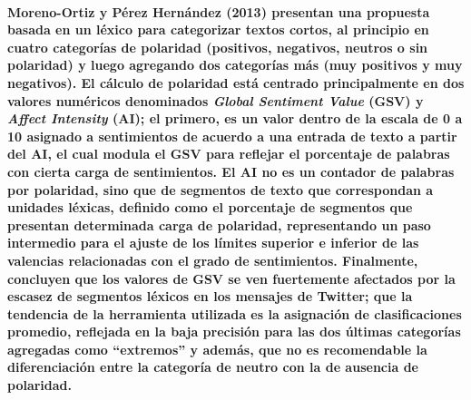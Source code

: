 \paragraph{Moreno-Ortiz y P\'erez Hern\'andez (2013) presentan una propuesta basada en un l\'exico para categorizar textos cortos, al principio en cuatro categor\'ias de polaridad (positivos, negativos, neutros o sin polaridad) y luego agregando dos categor\'ias m\'as (muy positivos y muy negativos). El c\'alculo de polaridad est\'a centrado principalmente en dos valores num\'ericos denominados \textit{Global Sentiment Value} (GSV) y \textit{Affect Intensity} (AI); el primero, es un valor dentro de la escala de 0 a 10 asignado a sentimientos de acuerdo a una entrada de texto a partir del AI, el cual modula el GSV para reflejar el porcentaje de palabras con cierta carga de sentimientos. El AI no es un contador de palabras por polaridad, sino que de segmentos de texto que correspondan a unidades l\'exicas, definido como el porcentaje de segmentos que presentan determinada carga de polaridad, representando un paso intermedio para el ajuste de los l\'imites superior e inferior de las valencias relacionadas con el grado de sentimientos. Finalmente, concluyen que los valores de GSV se ven fuertemente afectados por la escasez de segmentos l\'exicos en los mensajes de Twitter; que la tendencia de la herramienta utilizada es la asignaci\'on de clasificaciones promedio, reflejada en la baja precisi\'on para las dos \'ultimas categor\'ias agregadas como ``extremos'' y adem\'as, que no es recomendable la diferenciaci\'on entre la categor\'ia de neutro con la de ausencia de polaridad.}

